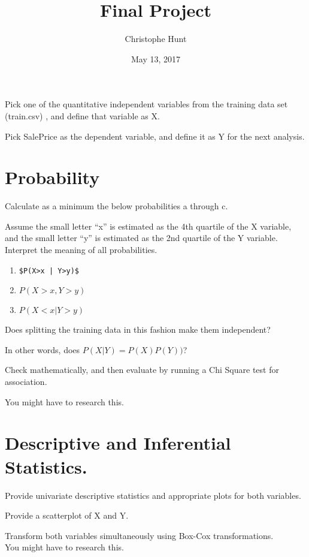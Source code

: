 \documentclass[]{article}
\title{Final Project}
\author{Christophe Hunt}
\date{May 13, 2017}
\begin{document}
\maketitle

{
\setcounter{tocdepth}{2}
\tableofcontents
}
Pick one of the quantitative independent variables from the training
data set (train.csv) , and define that variable as X.

Pick SalePrice as the dependent variable, and define it as Y for the
next analysis.

\section{Probability}\label{probability}

Calculate as a minimum the below probabilities a through c.

Assume the small letter ``x'' is estimated as the 4th quartile of the X
variable, and the small letter ``y'' is estimated as the 2nd quartile of
the Y variable. Interpret the meaning of all probabilities.

\begin{enumerate}
\def\labelenumi{\alph{enumi}.}
\item
\begin{verbatim}
$P(X>x | Y>y)$  
\end{verbatim}
\item
  \(P(X>x, Y>y)\)
\item
  \(P(X<x | Y>y)\)
\end{enumerate}

Does splitting the training data in this fashion make them independent?

In other words, does \(P(X|Y)=P(X)P(Y))\)?

Check mathematically, and then evaluate by running a Chi Square test for
association.

You might have to research this.

\section{Descriptive and Inferential
Statistics.}\label{descriptive-and-inferential-statistics.}

Provide univariate descriptive statistics and appropriate plots for both
variables.

Provide a scatterplot of X and Y.

Transform both variables simultaneously using Box-Cox transformations.\\
You might have to research this.
\end{document}
